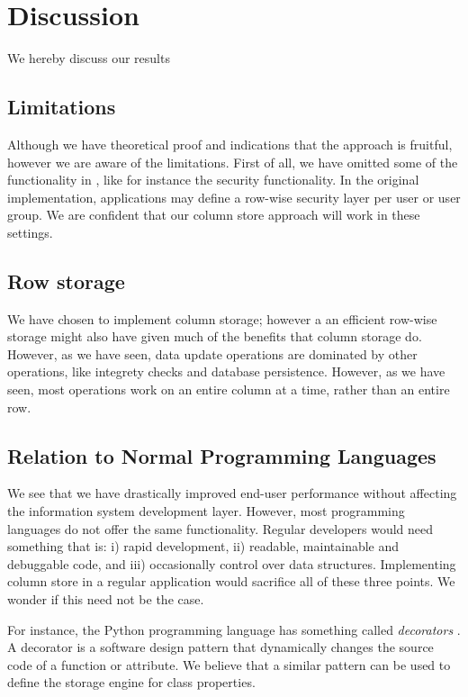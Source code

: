 \chapter{Discussion}
\label{chap:Discussion}
We hereby discuss our results

\section{Limitations}
\label{sec:Limitations}
Although we have theoretical proof and indications that the approach is fruitful, however we are aware of the limitations. First of all, we have omitted some of the functionality in \gap, like for instance the security functionality. In the original implementation, applications may define a row-wise security layer per user or user group. We are confident that our column store approach will work in these settings.

\section{Row storage}
\label{sec:Row storage}
We have chosen to implement column storage; however a an efficient row-wise storage might also have given much of the benefits that column storage do. However, as we have seen, data update operations are dominated by other operations, like integrety checks and database persistence. However, as we have seen, most operations work on an entire column at a time, rather than an entire row. 

\section{Relation to Normal Programming Languages}
\label{sec:Relation to Normal Programming Languages}
We see that we have drastically improved end-user performance without affecting the information system development layer. However, most programming languages do not offer the same functionality. Regular developers would need something that is: i) rapid development, ii) readable, maintainable and debuggable code, and iii) occasionally control over data structures. Implementing column store in a regular application would sacrifice all of these three points. We wonder if this need not be the case.

For instance, the Python programming language has something called \textit{decorators} \cite{noauthor_undated-aq}. A decorator is a software design pattern that dynamically changes the source code of a function or attribute. We believe that a similar pattern can be used to define the storage engine for class properties.

